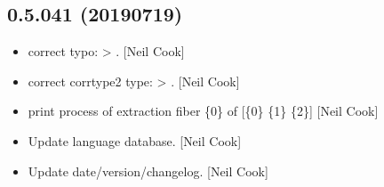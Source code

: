 \documentclass[a4paper,10pt,english]{report}
\begin{document}
\subsection{0.5.041 (2019\sphinxhyphen{}07\sphinxhyphen{}19)}
\label{\detokenize{misc/changelog:id120}}\begin{itemize}
\item {} 
 \sphinxhyphen{} correct typo:  \textendash{}\textgreater{} .
{[}Neil Cook{]}

\item {} 
 \sphinxhyphen{} correct corrtype2 type:
 \textendash{}\textgreater{} . {[}Neil Cook{]}

\item {} 
 \sphinxhyphen{} print process of extraction fiber \{0\} of {[}\{0\}
\{1\} \{2\}{]} {[}Neil Cook{]}

\item {} 
Update language database. {[}Neil Cook{]}

\item {} 
Update date/version/changelog. {[}Neil Cook{]}

\end{itemize}
\end{document}
